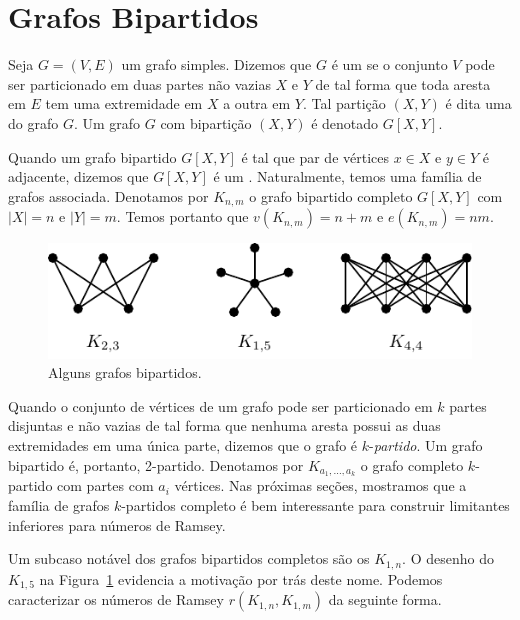 \section{Grafos Bipartidos}

Seja $G = (V,E)$ um grafo simples. Dizemos que $G$ é um  se o conjunto $V$ pode ser particionado em duas partes não vazias $X$ e $Y$ de tal forma que toda aresta em $E$ tem uma extremidade em $X$ a outra em $Y$. Tal partição $(X,Y)$ é dita uma  do grafo $G$. Um grafo $G$ com bipartição $(X,Y)$ é denotado $G[X,Y]$.

Quando um grafo bipartido $G[X,Y]$ é tal que par de vértices $x \in X$ e $y \in Y$ é adjacente, dizemos que $G[X,Y]$ é um . Naturalmente, temos uma família de grafos associada. Denotamos por $K_{n,m}$ o grafo bipartido completo $G[X,Y]$ com $|X| = n$ e $|Y| = m$. Temos portanto que $v(K_{n,m}) = n + m$ e $e(K_{n,m}) = nm$.

\begin{figure}[ht!]
\centering
\includegraphics{figures/3_graph_1_part}
\caption{Alguns grafos bipartidos.}
\label{graph:fig:part}
\end{figure}

Quando o conjunto de vértices de um grafo pode ser particionado em $k$ partes disjuntas e não vazias de tal forma que nenhuma aresta possui as duas extremidades em uma única parte, dizemos que o grafo é $k$-\emph{partido}. Um grafo bipartido é, portanto, 2-partido. Denotamos por $K_{a_1, \dots, a_k}$ o grafo completo $k$-partido com partes com $a_i$ vértices. Nas próximas seções, mostramos que a família de grafos $k$-partidos completo é bem interessante para construir limitantes inferiores para números de Ramsey.

Um subcaso notável dos grafos bipartidos completos são os  $K_{1,n}$. O desenho do $K_{1,5}$ na Figura~\ref{graph:fig:part} evidencia a motivação por trás deste nome. Podemos caracterizar os números de Ramsey $r(K_{1,n}, K_{1,m})$ da seguinte forma.

